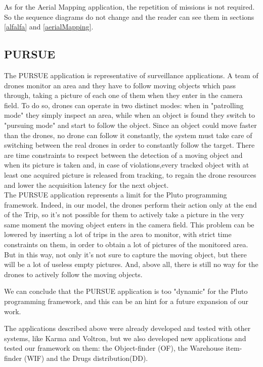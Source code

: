 As for the Aerial Mapping\cite{putti} application, the repetition of missions is not required.
So the sequence diagrams do not change and the reader can see them in sections \ref{alfalfa} and \ref{aerialMapping}.


\subsection{PURSUE}\label{PURSUE}


The PURSUE application\cite{pursue} is representative of surveillance applications. A team of drones monitor an area and they have to follow moving objects which pass through, taking a picture of each one of them when they enter in the camera field.
To do so, drones can operate in two distinct modes: when in "patrolling mode" they simply inspect an area, while when an object is found they switch to "pursuing mode" and start to follow the object.
Since an object could move faster than the drones, no drone can follow it constantly, the system must take care of switching between the real drones in order to constantly follow the target.
There are time constraints to respect between the detection of a moving object and when its picture is taken and, in case of violations,every tracked object with at least one acquired picture is released from tracking, to regain the drone resources and lower the acquisition latency for the next object.
\\

The PURSUE application represents a limit for the Pluto programming framework.
Indeed, in our model, the drones perform their action only at the end of the Trip, so it's not possible for them to actively take a picture in the very same moment the moving object enters in the camera field.
This problem can be lowered by inserting a lot of trips in the area to monitor, with strict time constraints on them, in order to obtain a lot of pictures of the monitored area.
But in this way, not only it's not sure to capture the moving object, but there will be a lot of useless empty pictures.
And, above all, there is still no way for the drones to actively follow the moving objects.

We can conclude that the PURSUE application is too "dynamic" for the Pluto programming framework, and this can be an hint for a future expansion of our work.


\newpage

The applications described above were already developed and tested with other systems, like Karma\cite{karma} and Voltron\cite{voltron}, but we also developed new applications and tested our framework on them:
the Object-finder (OF), the Warehouse item-finder (WIF) and the Drugs distribution(DD).
\\

